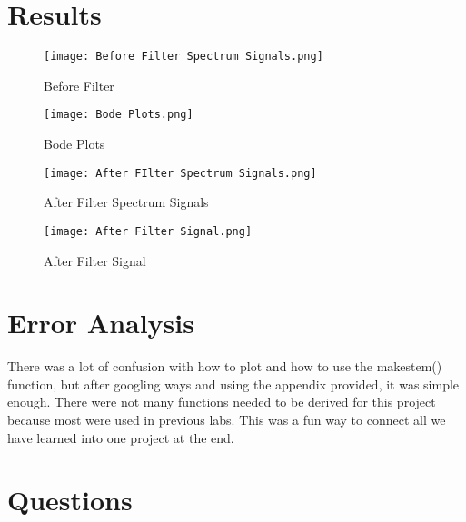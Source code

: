 \documentclass[12pt]{report}
\begin{document}
\newpage

\section{Results}

\begin{figure}[ht]
\begin{center}
\texttt{[image: Before Filter Spectrum Signals.png]}
\caption{Before Filter}
\end{center}
\end{figure}

\begin{figure}[ht]
\begin{center}
\texttt{[image: Bode Plots.png]}
\caption{Bode Plots}
\end{center}
\end{figure}

\begin{figure}[ht]
\begin{center}
\texttt{[image: After FIlter Spectrum Signals.png]}
\caption{After Filter Spectrum Signals}
\end{center}
\end{figure}

\begin{figure}[ht]
\begin{center}
\texttt{[image: After Filter Signal.png]}
\caption{After Filter Signal}
\end{center}
\end{figure}
\clearpage 

\newpage 

\section{Error Analysis}
There was a lot of confusion with how to plot and how to use the makestem() function, but after googling ways and using the appendix provided, it was simple enough. There were not many functions needed to be derived for this project because most were used in previous labs. This was a fun way to connect all we have learned into one project at the end. 

\section{Questions}
\end{document}
